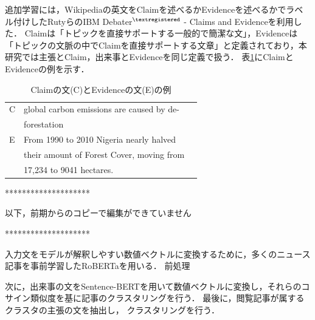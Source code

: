 \documentclass[a4paper, twocolumn, 10pt]{jarticle}
\begin{document}
追加学習には，Wikipediaの英文をClaimを述べるかEvidenceを述べるかでラベル付けしたRutyらのIBM Debater$^{\textregistered}$ - Claims and Evidenceを利用した\cite{rinott_show_2015}．
Claimは「トピックを直接サポートする一般的で簡潔な文」，Evidenceは「トピックの文脈の中でClaimを直接サポートする文章」と定義されており，本研究では主張とClaim，出来事とEvidenceを同じ定義で扱う．
表\ref{claim_evidence_example}にClaimとEvidenceの例を示す．

\begin{table}[h]
  \caption{Claimの文(C)とEvidenceの文(E)の例}
  \centering
  \begin{tabular}{llp{6cm}}
    \hline
    C & global carbon emissions are caused by de-
    \\
    & forestation
    \\
    E & From 1990 to 2010 Nigeria nearly halved
    \\
    & their amount of Forest Cover, moving from
    \\
    & 17,234 to 9041 hectares.
    \\
    \hline
  \end{tabular}
  \label{claim_evidence_example}
\end{table}

********************

以下，前期からのコピーで編集ができていません

********************


入力文をモデルが解釈しやすい数値ベクトルに変換するために，多くのニュース記事を事前学習したRoBERTaを用いる．
前処理


次に，出来事の文をSentence-BERTを用いて数値ベクトルに変換し，それらのコサイン類似度を基に記事のクラスタリングを行う．
最後に，閲覧記事が属するクラスタの主張の文を抽出し，
クラスタリングを行う．
\end{document}
